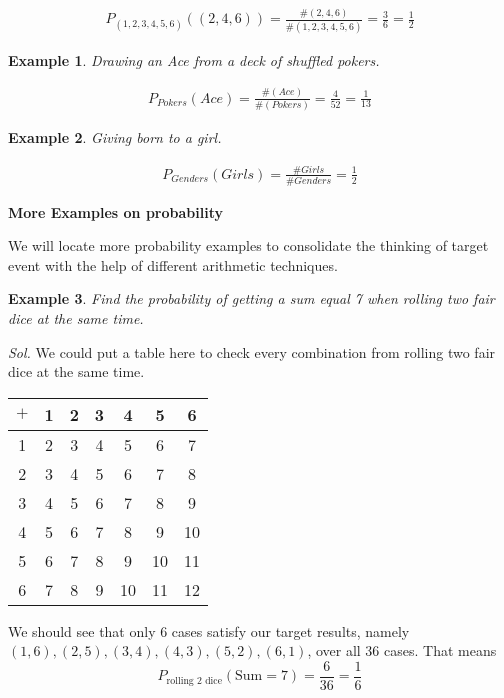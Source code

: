 \documentclass[12pt]{article}
\newtheorem{example}{Example}
\begin{document}
    \begin{align*}
        P_{(1,2,3,4,5,6)}((2,4,6))=\frac{\#(2,4,6)}{\#(1,2,3,4,5,6)}=\frac{3}{6}=\frac{1}{2}
    \end{align*}

    \begin{example}
        Drawing an Ace from a deck of shuffled pokers.
    \end{example}

    \begin{align*}
        P_{Pokers}(Ace)=\frac{\#(Ace)}{\#(Pokers)}=\frac{4}{52}=\frac{1}{13}
    \end{align*}

    \begin{example}
        Giving born to a girl.
    \end{example}

    \begin{align*}
        P_{Genders}(Girls)=\frac{\#Girls}{\#Genders}=\frac{1}{2}
    \end{align*}

    \begin{center}
        \textbf{More Examples on probability}
    \end{center}

    We will locate more probability examples to consolidate the thinking of target event with the help of different arithmetic techniques.

    \begin{example}
        Find the probability of getting a sum equal 7 when rolling two fair dice at the same time.
    \end{example}

    \textit{ Sol.} We could put a table here to check every combination from rolling two fair dice at the same time.
    \begin{center}
        \begin{tabular}{c||c|c|c|c|c|c}
            $+$&1&2&3&4&5&6\\
            \hline
            \hline
            1&2&3&4&5&6&7\\
            \hline
            2&3&4&5&6&7&8\\
            \hline
            3&4&5&6&7&8&9\\
            \hline
            4&5&6&7&8&9&10\\
            \hline
            5&6&7&8&9&10&11\\
            \hline
            6&7&8&9&10&11&12\\
        \end{tabular}
    \end{center} 
    We should see that only 6 cases satisfy our target results, namely $(1,6),(2,5),(3,4),(4,3),(5,2),(6,1)$, over all 36 cases. That means $$P_{\textrm{rolling 2 dice}}(\textrm{Sum}=7)=\frac{6}{36}=\frac{1}{6}$$
\end{document}
